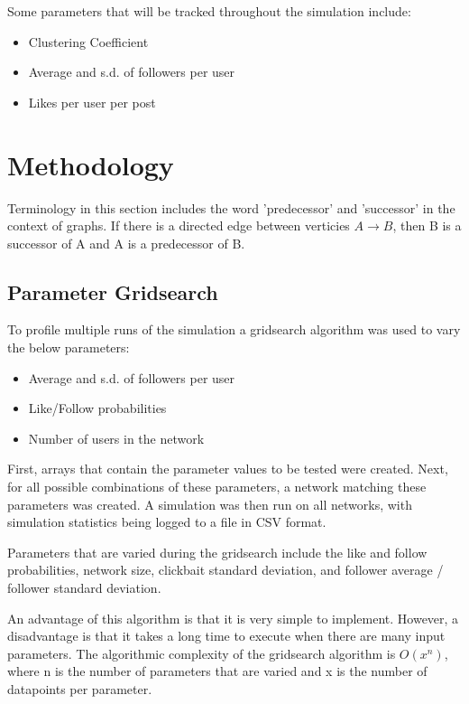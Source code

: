 \documentclass{article}
\begin{document}
Some parameters that will be tracked throughout the simulation include:
\begin{itemize}
    \item Clustering Coefficient
    \item Average and s.d. of followers per user
    \item Likes per user per post
\end{itemize}

\section{Methodology}

Terminology in this section includes the word 'predecessor' and 'successor'
in the context of graphs. If there is a directed edge between verticies
$A \rightarrow B$, then B is a successor of A and A is a predecessor of B.

\subsection{Parameter Gridsearch}

To profile multiple runs of the simulation a gridsearch algorithm was used
to vary the below parameters:
\begin{itemize}
\item Average and s.d. of followers per user
\item Like/Follow probabilities
\item Number of users in the network
\end{itemize}

First, arrays that contain the parameter values to be tested were created.
Next, for all possible combinations of these parameters, a network
matching these parameters was created. A simulation was then run on all networks,
with simulation statistics being logged to a file in CSV format.

Parameters that are varied during the gridsearch include the like and follow probabilities,
network size, clickbait standard deviation, and
follower average / follower standard deviation.

An advantage of this algorithm is that it is very simple to implement.
However, a disadvantage is that it takes a long time to execute when there are many input parameters.
The algorithmic complexity of the gridsearch algorithm
is $O(x^n)$, where n is the number of parameters that are varied and x is the number
of datapoints per parameter.
\end{document}
